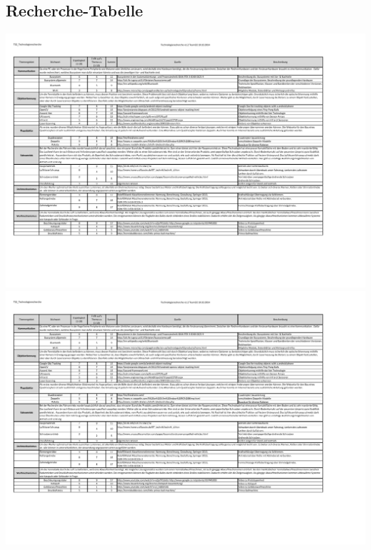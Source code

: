 \begin{landscape}
	\section{Recherche-Tabelle}	
		\includegraphics[page=1,scale=0.84,clip,trim=6.4mm 39mm 35mm 18mm]{Recherche/Extern/Produktrecherche.pdf}
		\newpage
		\includegraphics[page=2,scale=0.82,clip,trim=6.4mm 39mm 35mm 18mm]{Recherche/Extern/Produktrecherche.pdf}
\end{landscape} 